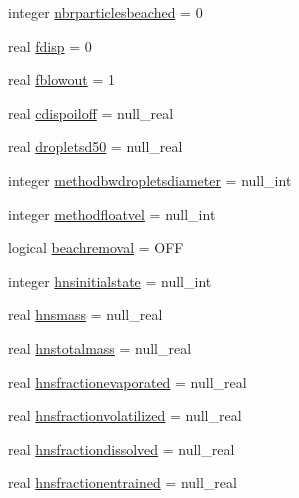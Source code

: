 \begin{DoxyCompactItemize}
\item 
integer \mbox{\hyperlink{structmodulelagrangianglobal_1_1t__origin_a1b54a18886c409dfd468d8f122de3024}{nbrparticlesbeached}} = 0
\item 
real \mbox{\hyperlink{structmodulelagrangianglobal_1_1t__origin_a173baffa0847d0284d62a3f08b04bb21}{fdisp}} = 0
\item 
real \mbox{\hyperlink{structmodulelagrangianglobal_1_1t__origin_abee182417530f33b587ce19aa4616362}{fblowout}} = 1
\item 
real \mbox{\hyperlink{structmodulelagrangianglobal_1_1t__origin_a0a893768a110daa9986c742580661492}{cdispoiloff}} = null\+\_\+real
\item 
real \mbox{\hyperlink{structmodulelagrangianglobal_1_1t__origin_aed4192e65cec8a1ac943c060cce3946e}{dropletsd50}} = null\+\_\+real
\item 
integer \mbox{\hyperlink{structmodulelagrangianglobal_1_1t__origin_afa8e233fa5a1352f867bc64847f9df94}{methodbwdropletsdiameter}} = null\+\_\+int
\item 
integer \mbox{\hyperlink{structmodulelagrangianglobal_1_1t__origin_a7ab7049b5dd6db197b9ab091f9ecafd2}{methodfloatvel}} = null\+\_\+int
\item 
logical \mbox{\hyperlink{structmodulelagrangianglobal_1_1t__origin_a1ea593241a27635293f74f71a31b7a76}{beachremoval}} = O\+FF
\item 
integer \mbox{\hyperlink{structmodulelagrangianglobal_1_1t__origin_ae0b2671ca11b06a5e7c16448a627fae4}{hnsinitialstate}} = null\+\_\+int
\item 
real \mbox{\hyperlink{structmodulelagrangianglobal_1_1t__origin_a1154fb6bd35c0631e3914db1ba8f54d6}{hnsmass}} = null\+\_\+real
\item 
real \mbox{\hyperlink{structmodulelagrangianglobal_1_1t__origin_a95557ea5f831eb86bacb589371220cab}{hnstotalmass}} = null\+\_\+real
\item 
real \mbox{\hyperlink{structmodulelagrangianglobal_1_1t__origin_a85e8624f588395d2037e7e9a307af7fc}{hnsfractionevaporated}} = null\+\_\+real
\item 
real \mbox{\hyperlink{structmodulelagrangianglobal_1_1t__origin_a90d27faa0cc6aabcac8fb9b235a1f1fb}{hnsfractionvolatilized}} = null\+\_\+real
\item 
real \mbox{\hyperlink{structmodulelagrangianglobal_1_1t__origin_aaad5a9580b735f826a85099412d2cc21}{hnsfractiondissolved}} = null\+\_\+real
\item 
real \mbox{\hyperlink{structmodulelagrangianglobal_1_1t__origin_a42495d6ed0aeeed724aac81a269176af}{hnsfractionentrained}} = null\+\_\+real

\end{DoxyCompactItemize}
